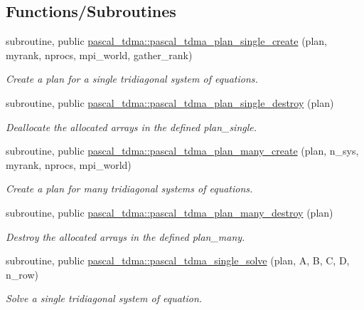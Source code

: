 \subsection*{Functions/\+Subroutines}
\begin{DoxyCompactItemize}
\item 
subroutine, public \mbox{\hyperlink{namespacepascal__tdma_a5dfc2d7c919b47ad364a74d141532a9f}{pascal\+\_\+tdma\+::pascal\+\_\+tdma\+\_\+plan\+\_\+single\+\_\+create}} (plan, myrank, nprocs, mpi\+\_\+world, gather\+\_\+rank)
\begin{DoxyCompactList}\small\item\em Create a plan for a single tridiagonal system of equations. \end{DoxyCompactList}\item 
subroutine, public \mbox{\hyperlink{namespacepascal__tdma_adb04e59c740ce6c4b9518dd86eaeb594}{pascal\+\_\+tdma\+::pascal\+\_\+tdma\+\_\+plan\+\_\+single\+\_\+destroy}} (plan)
\begin{DoxyCompactList}\small\item\em Deallocate the allocated arrays in the defined plan\+\_\+single. \end{DoxyCompactList}\item 
subroutine, public \mbox{\hyperlink{namespacepascal__tdma_a7e9c24b343ae949044eccc8692dcc6e9}{pascal\+\_\+tdma\+::pascal\+\_\+tdma\+\_\+plan\+\_\+many\+\_\+create}} (plan, n\+\_\+sys, myrank, nprocs, mpi\+\_\+world)
\begin{DoxyCompactList}\small\item\em Create a plan for many tridiagonal systems of equations. \end{DoxyCompactList}\item 
subroutine, public \mbox{\hyperlink{namespacepascal__tdma_a8438e6774617871b147af9ec8bdad6ce}{pascal\+\_\+tdma\+::pascal\+\_\+tdma\+\_\+plan\+\_\+many\+\_\+destroy}} (plan)
\begin{DoxyCompactList}\small\item\em Destroy the allocated arrays in the defined plan\+\_\+many. \end{DoxyCompactList}\item 
subroutine, public \mbox{\hyperlink{namespacepascal__tdma_ab14e132231d4b53fd65dd333ccc85a50}{pascal\+\_\+tdma\+::pascal\+\_\+tdma\+\_\+single\+\_\+solve}} (plan, A, B, C, D, n\+\_\+row)
\begin{DoxyCompactList}\small\item\em Solve a single tridiagonal system of equation. \end{DoxyCompactList}\item 

\end{DoxyCompactItemize}
